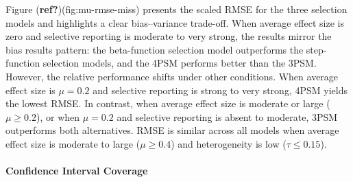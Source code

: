 \documentclass[
]{article}
\begin{document}
Figure (\textbf{ref?})(fig:mu-rmse-miss) presents the scaled RMSE for
the three selection models and highlights a clear bias--variance
trade-off. When average effect size is zero and selective reporting is
moderate to very strong, the results mirror the bias results pattern:
the beta-function selection model outperforms the step-function
selection models, and the 4PSM performs better than the 3PSM. However,
the relative performance shifts under other conditions. When average
effect size is \(\mu = 0.2\) and selective reporting is strong to very
strong, 4PSM yields the lowest RMSE. In contrast, when average effect
size is moderate or large (\(\mu \geq 0.2\)), or when \(\mu = 0.2\) and
selective reporting is absent to moderate, 3PSM outperforms both
alternatives. RMSE is similar across all models when average effect size
is moderate to large (\(\mu \geq 0.4\)) and heterogeneity is low
(\(\tau \leq 0.15\)).

\paragraph{Confidence Interval
Coverage}\label{confidence-interval-coverage-1}
\end{document}
